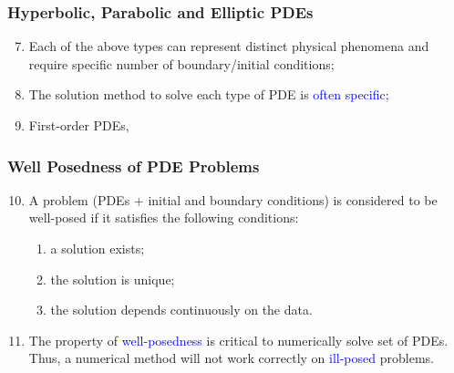 \documentclass[10pt,compress]{beamer}
\begin{document}
\begin{frame}
 \frametitle{Hyperbolic, Parabolic and Elliptic PDEs} 
 \begin{enumerate}
   \setcounter{enumi}{6}
   \item <1-> Each of the above types can represent distinct physical phenomena and require specific number of boundary/initial conditions;
   \item <2->The solution method to solve each type of PDE is \textcolor{blue}{often specific};
   \item <3-> First-order PDEs,

 \end{enumerate}   
 
\end{frame}


\begin{frame}
 \frametitle{Well Posedness of PDE Problems} 
 \begin{enumerate}
   \setcounter{enumi}{9}
   \item <1-> A problem (PDEs + initial and boundary conditions) is considered to be well-posed if it satisfies the following conditions:
      \begin{enumerate}
        \item <2-> a solution exists;
        \item <3-> the solution is unique;
        \item <4-> the solution depends continuously on the data.
      \end{enumerate}
    \item <5-> The property of \textcolor{blue}{well-posedness} is critical to numerically solve set of PDEs. Thus, a numerical method will not work correctly on \textcolor{blue}{ill-posed} problems. 
 \end{enumerate}   
 
\end{frame}
\end{document}
